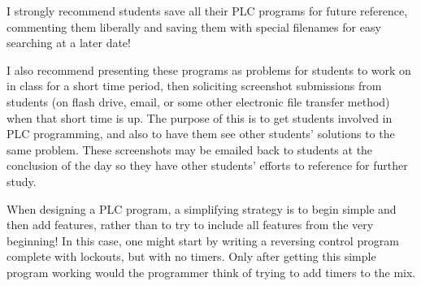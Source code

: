 





I strongly recommend students save all their PLC programs for future reference, commenting them liberally and saving them with special filenames for easy searching at a later date!

\vskip 10pt

I also recommend presenting these programs as problems for students to work on in class for a short time period, then soliciting screenshot submissions from students (on flash drive, email, or some other electronic file transfer method) when that short time is up.  The purpose of this is to get students involved in PLC programming, and also to have them see other students' solutions to the same problem.  These screenshots may be emailed back to students at the conclusion of the day so they have other students' efforts to reference for further study.

\vskip 10pt

When designing a PLC program, a simplifying strategy is to begin simple and then add features, rather than to try to include all features from the very beginning!  In this case, one might start by writing a reversing control program complete with lockouts, but with no timers.  Only after getting this simple program working would the programmer think of trying to add timers to the mix.




